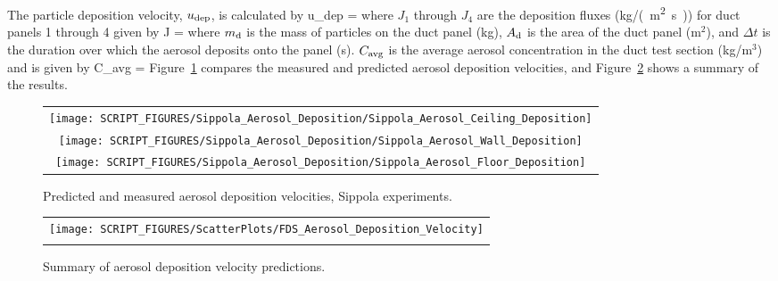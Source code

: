 \noindent The particle deposition velocity, $u_{\rm dep}$, is calculated by
\be
   u_{\rm dep} = 
\ee
where $J_1$ through $J_4$ are the deposition fluxes (\si{kg/(m^2.s)}) for duct panels 1 through 4 given by
\be
   J = 
\ee
where $m_{\rm d}$ is the mass of particles on the duct panel (kg), $A_{\rm d}$ is the area of the duct panel (m$^2$),
and $\Delta t$ is the duration over which the aerosol deposits onto the panel (s). $C_{\rm avg}$ is the
average aerosol concentration in the duct test section (kg/m$^3$) and is given by
\be
   C_{\rm avg} = 
\ee
Figure~\ref{Sippola_Aerosol_Deposition_Velocity} compares the measured and predicted aerosol deposition velocities,
and Figure~\ref{Summary_Aerosol_Deposition_Velocity} shows a summary of the results.

\begin{figure}[ht]
\begin{center}
\begin{tabular}{c}
\texttt{[image: SCRIPT\_FIGURES/Sippola\_Aerosol\_Deposition/Sippola\_Aerosol\_Ceiling\_Deposition]} \\
\texttt{[image: SCRIPT\_FIGURES/Sippola\_Aerosol\_Deposition/Sippola\_Aerosol\_Wall\_Deposition]} \\
\texttt{[image: SCRIPT\_FIGURES/Sippola\_Aerosol\_Deposition/Sippola\_Aerosol\_Floor\_Deposition]}
\end{tabular}
\end{center}
\caption[Predicted and measured aerosol deposition velocities, Sippola experiments]
{Predicted and measured aerosol deposition velocities, Sippola experiments.}
\label{Sippola_Aerosol_Deposition_Velocity}
\end{figure}

\begin{figure}[ht]
\begin{center}
\begin{tabular}{c}
\texttt{[image: SCRIPT\_FIGURES/ScatterPlots/FDS\_Aerosol\_Deposition\_Velocity]} \\
\vspace{0.25in} \\
\end{tabular}
\end{center}
\caption[Summary of aerosol deposition velocity predictions]
{Summary of aerosol deposition velocity predictions.}
\label{Summary_Aerosol_Deposition_Velocity}
\end{figure}


